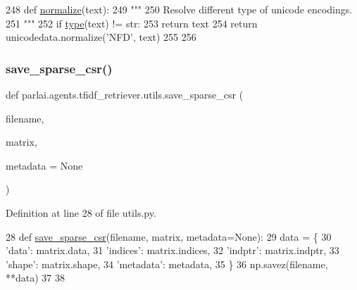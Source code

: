 \begin{DoxyCode}
248 \textcolor{keyword}{def }\hyperlink{namespaceparlai_1_1agents_1_1tfidf__retriever_1_1utils_ace97d2139f74e163a7ba81fcfb505f1c}{normalize}(text):
249     \textcolor{stringliteral}{"""}
250 \textcolor{stringliteral}{    Resolve different type of unicode encodings.}
251 \textcolor{stringliteral}{    """}
252     \textcolor{keywordflow}{if} \hyperlink{namespaceparlai_1_1agents_1_1tfidf__retriever_1_1build__tfidf_ad5dfae268e23f506da084a9efb72f619}{type}(text) != str:
253         \textcolor{keywordflow}{return} text
254     \textcolor{keywordflow}{return} unicodedata.normalize(\textcolor{stringliteral}{'NFD'}, text)
255 
256 
\end{DoxyCode}
\mbox{\label{namespaceparlai_1_1agents_1_1tfidf__retriever_1_1utils_ad884f6e5806325937ff74a63bc7eea82}} 
\subsubsection{\texorpdfstring{save\+\_\+sparse\+\_\+csr()}{save\_sparse\_csr()}}
{\footnotesize\ttfamily def parlai.\+agents.\+tfidf\+\_\+retriever.\+utils.\+save\+\_\+sparse\+\_\+csr (\begin{DoxyParamCaption}\item[{}]{filename,  }\item[{}]{matrix,  }\item[{}]{metadata = {\ttfamily None} }\end{DoxyParamCaption})}



Definition at line 28 of file utils.\+py.


\begin{DoxyCode}
28 \textcolor{keyword}{def }\hyperlink{namespaceparlai_1_1agents_1_1tfidf__retriever_1_1utils_ad884f6e5806325937ff74a63bc7eea82}{save\_sparse\_csr}(filename, matrix, metadata=None):
29     data = \{
30         \textcolor{stringliteral}{'data'}: matrix.data,
31         \textcolor{stringliteral}{'indices'}: matrix.indices,
32         \textcolor{stringliteral}{'indptr'}: matrix.indptr,
33         \textcolor{stringliteral}{'shape'}: matrix.shape,
34         \textcolor{stringliteral}{'metadata'}: metadata,
35     \}
36     np.savez(filename, **data)
37 
38 
\end{DoxyCode}
\mbox{\label{namespaceparlai_1_1agents_1_1tfidf__retriever_1_1utils_a6d1c2b31f2a5d432d7cb677f436e17c0}} 
